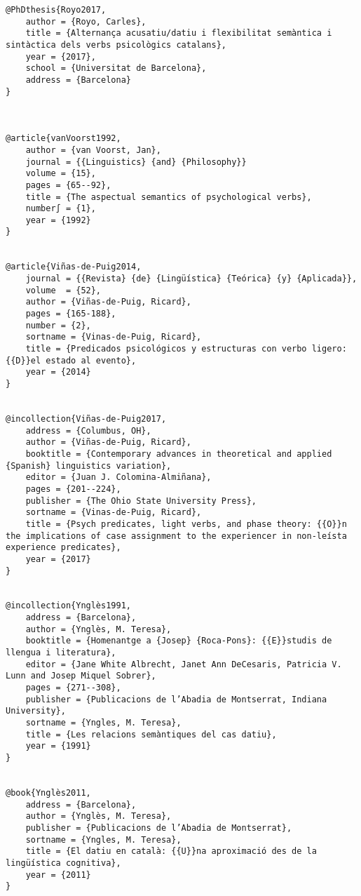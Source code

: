 \documentclass[output=paper,modfonts,nonflat,newtxmath]{langsci/langscibook}
\begin{document}
\begin{verbatim}
@PhDthesis{Royo2017,
	author = {Royo, Carles},
	title = {Alternança acusatiu/datiu i flexibilitat semàntica i sintàctica dels verbs psicològics catalans},
	year = {2017},
	school = {Universitat de Barcelona},
 	address = {Barcelona}
}



@article{vanVoorst1992,
	author = {van Voorst, Jan},
	journal = {{Linguistics} {and} {Philosophy}}
	volume = {15},
	pages = {65--92},
	title = {The aspectual semantics of psychological verbs},
	number∫ = {1},
	year = {1992}
}


@article{Viñas-de-Puig2014,
	journal = {{Revista} {de} {Lingüística} {Teórica} {y} {Aplicada}},
	volume  = {52},
	author = {Viñas-de-Puig, Ricard},
	pages = {165-188},
	number = {2},
	sortname = {Vinas-de-Puig, Ricard},
	title = {Predicados psicológicos y estructuras con verbo ligero: {{D}}el estado al evento},
	year = {2014}
}


@incollection{Viñas-de-Puig2017,
	address = {Columbus, OH},
	author = {Viñas-de-Puig, Ricard},
	booktitle = {Contemporary advances in theoretical and applied {Spanish} linguistics variation},
	editor = {Juan J. Colomina-Almiñana},
	pages = {201--224},
	publisher = {The Ohio State University Press},
	sortname = {Vinas-de-Puig, Ricard},
	title = {Psych predicates, light verbs, and phase theory: {{O}}n the implications of case assignment to the experiencer in non-leísta experience predicates},
	year = {2017}
}


@incollection{Ynglès1991,
	address = {Barcelona},
	author = {Ynglès, M. Teresa},
	booktitle = {Homenantge a {Josep} {Roca-Pons}: {{E}}studis de llengua i literatura},
	editor = {Jane White Albrecht, Janet Ann DeCesaris, Patricia V. Lunn and Josep Miquel Sobrer},
	pages = {271--308},
	publisher = {Publicacions de l’Abadia de Montserrat, Indiana University},
	sortname = {Yngles, M. Teresa},
	title = {Les relacions semàntiques del cas datiu},
	year = {1991}
}


@book{Ynglès2011,
	address = {Barcelona},
	author = {Ynglès, M. Teresa},
	publisher = {Publicacions de l’Abadia de Montserrat},
	sortname = {Yngles, M. Teresa},
	title = {El datiu en català: {{U}}na aproximació des de la lingüística cognitiva},
	year = {2011}
}


\end{verbatim}

\sloppy\printbibliography[heading=subbibliography,notkeyword=this]
\end{document}

